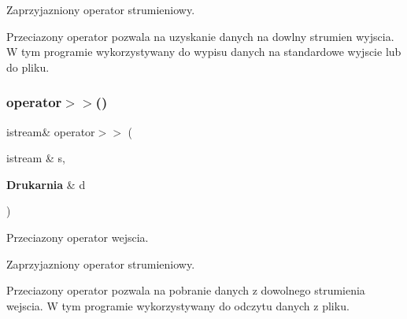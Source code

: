 Zaprzyjazniony operator strumieniowy.

Przeciazony operator pozwala na uzyskanie danych na dowlny strumien wyjscia. W tym programie wykorzystywany do wypisu danych na standardowe wyjscie lub do pliku. \mbox{\label{_drukarnia_8cpp_af4a4c25098d3c4c31f1f16d79bedeaa9}} 
\subsubsection{operator$>$$>$()}
{\footnotesize\ttfamily istream\& operator$>$$>$ (\begin{DoxyParamCaption}\item[{istream \&}]{s,  }\item[{\textbf{ Drukarnia} \&}]{d }\end{DoxyParamCaption})}



Przeciazony operator wejscia. 

Zaprzyjazniony operator strumieniowy.

Przeciazony operator pozwala na pobranie danych z dowolnego strumienia wejscia. W tym programie wykorzystywany do odczytu danych z pliku. 